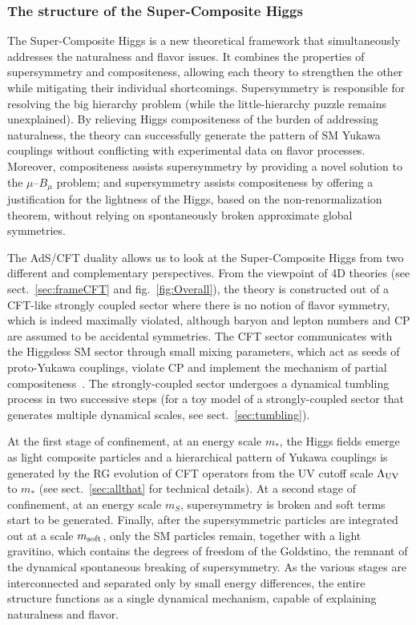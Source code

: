 \documentclass[a4paper,12pt]{article}
\def\fig#1{fig.~\ref{#1}}
\def\fig#1{fig.~\ref{#1}}
\def\sec#1{sect.~\ref{#1}}
\def\LUV{\Lambda_{\rm UV}}
\def\mst{m_*}
\def\mS{m_S}
\def\msoft{m_{\rm soft}}
\begin{document}
{{{{\subsubsection*{The structure of the Super-Composite Higgs}
The Super-Composite Higgs is a new theoretical framework that simultaneously addresses the naturalness and flavor issues. It combines the properties of supersymmetry and compositeness, allowing each theory to strengthen the other while mitigating their individual shortcomings. Supersymmetry is responsible for resolving the big hierarchy problem (while the little-hierarchy puzzle remains unexplained). By relieving Higgs compositeness of the burden of addressing naturalness, the theory can successfully generate the pattern of SM Yukawa couplings without conflicting with experimental data on flavor processes. Moreover, compositeness assists supersymmetry by providing a novel solution to the $\mu$--$B_\mu$ problem; and supersymmetry assists compositeness by offering a justification for the lightness of the Higgs, based on the non-renormalization theorem, without relying on spontaneously broken approximate global symmetries.

The AdS/CFT duality allows us to look at the Super-Composite Higgs from two different and complementary perspectives. From the viewpoint of 4D theories (see \sec{sec:frameCFT} and \fig{fig:Overall}), the theory is constructed out of a CFT-like strongly coupled sector where there is no notion of flavor symmetry, which is indeed maximally violated, although baryon and lepton numbers and CP are assumed to be accidental symmetries. The CFT sector communicates with the Higgsless SM sector through small mixing parameters, which act as seeds of proto-Yukawa couplings, violate CP and implement the mechanism of partial compositeness~\cite{Kaplan:1991dc}. The strongly-coupled sector undergoes a dynamical tumbling process in two successive steps (for a toy model of a strongly-coupled sector that generates multiple dynamical scales, see \sec{sec:tumbling}). 

At the first stage of confinement, at an energy scale $\mst$, the Higgs fields emerge as light composite particles and a hierarchical pattern of Yukawa couplings is generated by the RG evolution of CFT operators from the UV cutoff scale $\LUV$ to $\mst$ (see \sec{sec:allthat} for technical details). At a second stage of confinement, at an energy scale $\mS$, supersymmetry is broken and soft terms start to be generated. Finally, after the supersymmetric particles are integrated out at a scale $\msoft$, only the SM particles remain, together with a light gravitino, which contains the degrees of freedom of the Goldstino, the remnant of the dynamical spontaneous breaking of supersymmetry. As the various stages are interconnected and separated only by small energy differences, the entire structure functions as a single dynamical mechanism, capable of explaining naturalness and flavor.

}}}}
\end{document}
